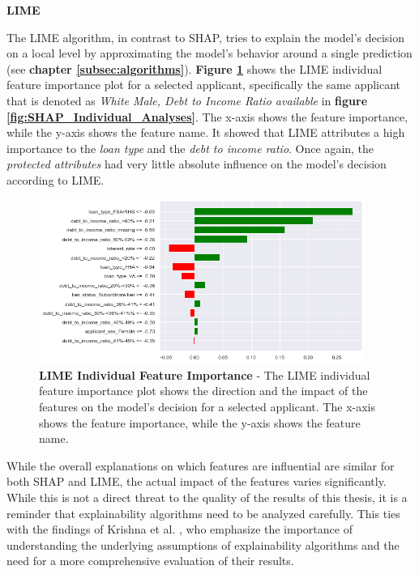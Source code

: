 \textbf{LIME}

The LIME algorithm, in contrast to SHAP, tries to explain the model's decision on a local level by approximating the model's behavior around a single prediction (see \textbf{chapter \ref{subsec:algorithms}}).
\textbf{Figure \ref{fig:LIME_Individual_Analyses}} shows the LIME individual feature importance plot for a selected applicant, specifically the same applicant that is denoted as \textit{White Male, Debt to Income Ratio available} in \textbf{figure \ref{fig:SHAP_Individual_Analyses}}. The x-axis shows the feature importance, while the y-axis shows the feature name.
It showed that LIME attributes a high importance to the \textit{loan type} and the \textit{debt to income ratio}. Once again, the \textit{protected attributes} had very little absolute influence on the model's decision according to LIME.

\begin{figure}[!htbp]
    \centering
    \includegraphics[width=0.95\textwidth]{images/CHXX_LIME_individual.png}
    \caption[LIME Individual Feature Importance]{\textbf{LIME Individual Feature Importance} - The LIME individual feature importance plot shows the direction and the impact of the features on the model's decision for a selected applicant. The x-axis shows the feature importance, while the y-axis shows the feature name.}
    \label{fig:LIME_Individual_Analyses}
\end{figure}

While the overall explanations on which features are influential are similar for both SHAP and LIME, the actual impact of the features varies significantly. While this is not a direct threat to the quality of the results of this thesis, it is a reminder that explainability algorithms need to be analyzed carefully. 
This ties with the findings of Krishna et al. \parencite{Krishna2022}, who emphasize the importance of understanding the underlying assumptions of explainability algorithms and the need for a more comprehensive evaluation of their results.

